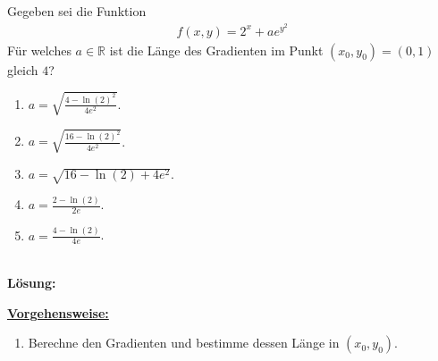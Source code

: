 \subsection*{}
Gegeben sei die Funktion
\begin{align*}
	f(x,y) = 2^x +  a e^{y^2}
\end{align*}
Für welches $a \in \mathbb{R}$ ist die Länge des Gradienten im Punkt $(x_0,y_0) = (0,1)$ gleich $4$?
\renewcommand{\labelenumi}{(\alph{enumi})}
\begin{enumerate}
	\item 
	$a = \sqrt{\frac{4 - \ln(2)^2}{4 e^2}} $.
	\item
	$a = \sqrt{\frac{16 - \ln(2)^2}{4 e^2}}$.
	\item
	$a = \sqrt{16 - \ln(2) + 4 e^2}$.
	\item
	$a = \frac{2 - \ln(2)}{2 e }$.
	\item 
	$a = \frac{4 - \ln(2)}{4e}$.
\end{enumerate}
\ \\
\textbf{Lösung:}
\begin{mdframed}
\underline{\textbf{Vorgehensweise:}}
\renewcommand{\labelenumi}{\theenumi.}
\begin{enumerate}
\item Berechne den Gradienten und bestimme dessen Länge in $(x_0,y_0)$.
\end{enumerate}
\end{mdframed}


